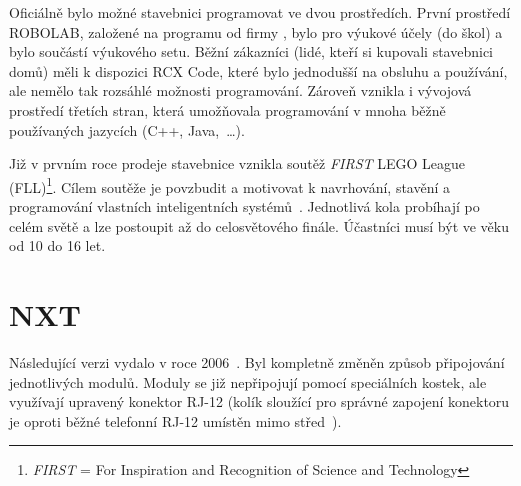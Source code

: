 
Oficiálně bylo možné stavebnici programovat ve dvou prostředích. První prostředí ROBOLAB, založené na programu \labview{ }od firmy \NI, bylo pro výukové účely (do škol) a bylo součástí výukového setu. 
Běžní zákazníci (lidé, kteří si kupovali stavebnici domů) měli k dispozici RCX Code, které bylo jednodušší na obsluhu a používání, ale nemělo tak rozsáhlé možnosti programování. 
Zároveň vznikla i vývojová prostředí třetích stran, která umožňovala programování v mnoha běžně používaných jazycích (C++, Java,~\dots).
% 
% 
% 
% 
%
%

Již v prvním roce prodeje stavebnice vznikla soutěž {\it FIRST} LEGO League (FLL)\footnote{{\it FIRST} = For Inspiration and Recognition of Science and Technology}. 
Cílem soutěže je povzbudit a motivovat k navrhování, stavění a programování vlastních inteligentních systémů~\cite{lego_FLL-about}. 
Jednotlivá kola probíhají po celém světě a lze postoupit až do celosvětového finále. %
Účastníci musí být ve věku od 10 do 16 let. 


\section{\legoM{ }NXT}

Následující verzi vydalo \lego{ }v roce 2006~\cite{lego_mindstormsHistory}. 
Byl kompletně změněn způsob připojování jednotlivých modulů. 
Moduly se již nepřipojují pomocí speciálních \lego{ }kostek, ale využívají upravený konektor RJ-12 %
(kolík sloužící pro správné zapojení konektoru je oproti běžné telefonní RJ-12 umístěn mimo střed~\cite{legoMindstorms_rj12-connector}). %
% 
% 
% 
%
%
%
%
%
%

